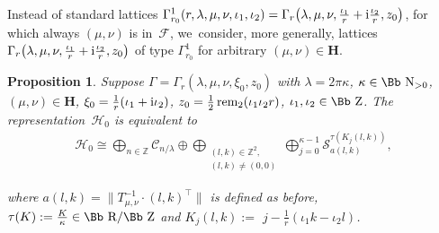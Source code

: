 \documentclass[10pt,a4paper]{amsart}
\newcommand\RR{{\mbox{\Bb R}}}
\newcommand\NN{{\mbox{\Bb N}}}
\newcommand\ZZ{{\mbox{\Bb Z}}}
\newcommand\Z{{\mathbb Z}}
\newcommand\cC{{\mathcal C}}
\newcommand\cH{{\mathcal H}}
\newcommand\cF{{\mathcal F}}
\newcommand{\rem}{\mathop{{\rm rem}}}
\numberwithin{equation}{section}
\newtheorem{Proposition}[Theorem]{Proposition}
 { \theoremstyle{definition}
\newtheorem{Definition}[Theorem]{Definition}
\newtheorem{Note}[Theorem]{Note}
\newtheorem{Example}[Theorem]{Example}
\newtheorem{Remark}[Theorem]{Remark} }
\begin{document}
Instead of standard lattices $\Gamma^1_{r_0}(r,\lambda,\mu,\nu,\iota_1,\iota_2)= \Gamma_r\big(\lambda,\mu,\nu,\frac{\iota_1}{r}+{\rm i}\frac{\iota_2}{r},z_0\big)$, for which always $(\mu,\nu)$ is in~$\cF$, we~consider, more generally, lattices $\Gamma_r\big(\lambda,\mu,\nu,\frac{\iota_1}{r}+{\rm i}\frac{\iota_2}{r},z_0\big)$ of type $\Gamma^1_{r_0}$ for arbitrary $(\mu,\nu)\in\textbf{H}$.
\begin{Proposition} \label{2piH0}
Suppose $\Gamma=\Gamma_r(\lambda,\mu,\nu,\xi_0,z_0)$ with $\lambda=2\pi\kappa$, $\kappa\in\NN_{>0}$, $(\mu,\nu)\in\textbf{H}$, $\xi_0=\frac1r(\iota_1+{\rm i}\iota_2)$, $z_0=\frac{1}{2}\rem_2(\iota_1\iota_2r)$, $\iota_1,\iota_2\in\ZZ$.
The representation~$\cH_0$ is equivalent to
\begin{gather*}
\cH_0\cong\bigoplus_{n\in \Z} \cC_{n/\lambda} \oplus \bigoplus _{\substack{(l,k)\in\Z^2,\\(l,k)\not=(0,0)}} \bigoplus_{j=0}^{\kappa-1} {\mathcal S}_{a(l,k)}^{\tau(K_j(l,k))},
\end{gather*}
{\sloppy
where $a(l,k)=\big\|T_{\mu,\nu}^{-1}\cdot(l,k)^\top\big\|$ is defined as before,
$\tau(K):=\frac{K}{\kappa}\in\RR/\ZZ$ and $K_j(l,k):=$ \mbox{$j-\frac1{r}(\iota_1 k-\iota_2l)$}.

}
\end{Proposition}
\end{document}

